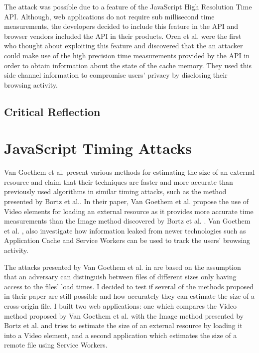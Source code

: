 \documentclass[10pt,a4paper,twoside]{book}
\begin{document}
The attack was possible due to a feature of the JavaScript High Resolution Time API. Although, web applications do not require sub millisecond time measurements, the developers decided to include this feature in the API and browser vendors included the API in their products. Oren et al. were the first who thought about exploiting this feature and discovered that the an attacker could make use of the high precision time measurements provided by the API in order to obtain information about the state of the cache memory. They used this side channel information to compromise users' privacy by disclosing their browsing activity.

\subsection{Critical Reflection}
 
\section{JavaScript Timing Attacks}
\label{vanpe}
Van Goethem et al. \cite{van2015clock} present various methods for estimating the size of an external resource and claim that their techniques are faster and more accurate than previously used algorithms in similar timing attacks, such as the method presented by Bortz et al.\cite{bortz2007exposing}. In their paper, Van Goethem et al. \cite{van2015clock} propose the use of Video elements for loading an external resource as it provides more accurate time measurements than the Image method discovered by Bortz et al. \cite{bortz2007exposing}. Van Goethem et al. \cite{van2015clock}, also investigate how information leaked from newer technologies such as Application Cache and Service Workers can be used to track the users' browsing activity.

The attacks presented by Van Goethem et al. in \cite{van2015clock} are based on the assumption that an adversary can distinguish between files of different sizes only having access to the files' load times. I decided to test if several of the methods proposed in their paper are still possible and how accurately they can estimate the size of a cross-origin file. I built two web applications: one which compares the Video method proposed by Van Goethem et al. \cite{van2015clock} with the Image method presented by Bortz et al. \cite{bortz2007exposing} and tries to estimate the size of an external resource by loading it into a Video element, and a second application which estimates the size of a remote file using Service Workers.
\end{document}
